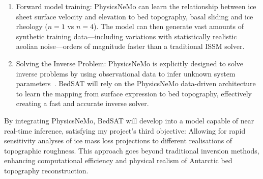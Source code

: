 \begin{enumerate}
\item{Forward model training}: PhysicsNeMo can learn the relationship between ice sheet surface velocity and elevation to bed topography, basal sliding and ice rheology ($n=1$ vs $n=4$). The model can then generate vast amounts of synthetic training data—including variations with statistically realistic aeolian noise—orders of magnitude faster than a traditional ISSM solver.

\item{Solving the Inverse Problem}: PhysicsNeMo is explicitly designed to solve inverse problems by using observational data to infer unknown system parameters~\cite{NVIDIA_NeMo_2025}. BedSAT will rely on the PhysicsNeMo data-driven architecture to learn the mapping from surface expression to bed topography, effectively creating a fast and accurate inverse solver.
\end{enumerate}

By integrating PhysicsNeMo, BedSAT will develop into a model capable of near real-time inference, satisfying my project's third objective: Allowing for rapid sensitivity analyses of ice mass loss projections to different realisations of topographic roughness. This approach goes beyond traditional inversion methods, enhancing computational efficiency and physical realism of Antarctic bed topography reconstruction.